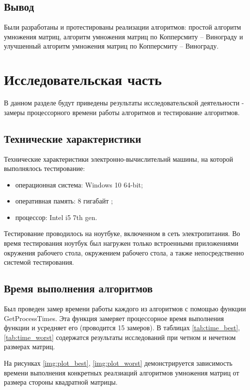 \subsection{Вывод}

Были разработаны и протестированы реализации алгоритмов: простой алгоритм умножения матриц, алгоритм умножения матриц по Копперсмиту – Винограду и улучшенный алгоритм умножения матриц по Копперсмиту – Винограду.

\section{Исследовательская часть}
В данном разделе будут приведены результаты исследовательской деятельности - замеры процессорного времени работы алгоритмов и тестирование алгоритмов.

\subsection{Технические характеристики}

Технические характеристики электронно-вычислительнй машины, на которой выполнялось тестирование:

\begin{itemize}
    \item операционная система: Windows 10 64-bit;
    \item оперативная память: 8 гигабайт ;
    \item процессор: Intel i5 7th gen.
\end{itemize}


Тестирование проводилось на ноутбуке, включенном в сеть электропитания. Во время тестирования ноутбук был нагружен только встроенными приложениями окружения рабочего стола, окружением рабочего стола, а также непосредственно системой тестирования.

\subsection{Время выполнения алгоритмов}

Был проведен замер времени работы каждого из алгоритмов с помощью функции GetProcessTimes. Эта функция замеряет процессорное время выполнения функции и усредняет его (проводится 15 замеров). В таблицах \ref{tab:time_best}, \ref{tab:time_worst} содержатся результаты исследований при четном и нечетном размерах матриц.

На рисунках \ref{img:plot_best}, \ref{img:plot_worst} демонстрируется зависимость времени выполнения конкретных реалзиаций алгоритмов умножения матриц от размера стороны квадратной матрицы. \\

